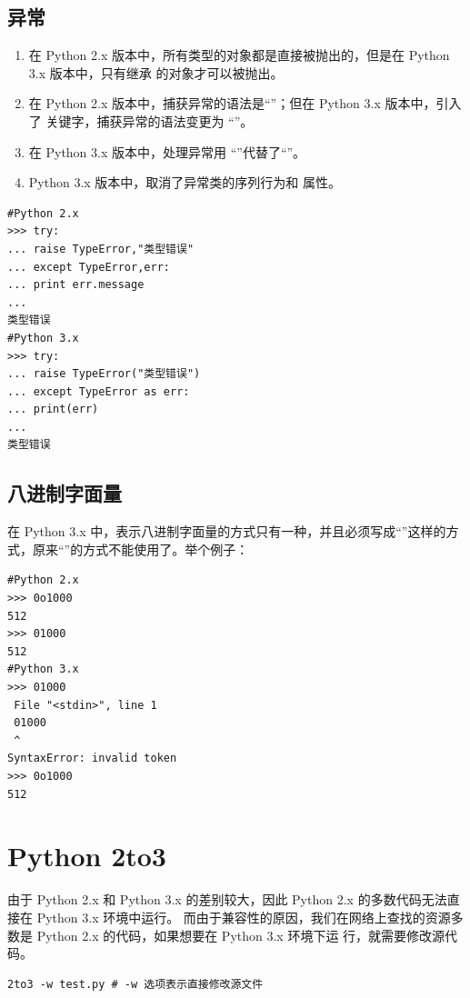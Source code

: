 \subsection{异常}
\begin{enumerate}[label=\arabic*)]
    \item 在 Python 2.x 版本中，所有类型的对象都是直接被抛出的，但是在 Python 3.x 版本中，只有继承  的对象才可以被抛出。
    \item 在 Python 2.x 版本中，捕获异常的语法是“”；但在 Python 3.x 版本中，引入了  关键字，捕获异常的语法变更为 “”。
    \item 在 Python 3.x 版本中，处理异常用 “”代替了“”。
    \item Python 3.x 版本中，取消了异常类的序列行为和  属性。
\end{enumerate}
\begin{lstlisting}[style=demostyle,numbers=none]
#Python 2.x
>>> try:
... raise TypeError,"类型错误" 
... except TypeError,err:
... print err.message
...
类型错误
#Python 3.x
>>> try:
... raise TypeError("类型错误")
... except TypeError as err:
... print(err)
...
类型错误
\end{lstlisting}   

\subsection{八进制字面量}
在 Python 3.x 中，表示八进制字面量的方式只有一种，并且必须写成“”这样的方式，原来“”的方式不能使用了。举个例子： 
\begin{lstlisting}[style=demostyle,numbers=none]
#Python 2.x
>>> 0o1000
512
>>> 01000
512
#Python 3.x
>>> 01000
 File "<stdin>", line 1
 01000
 ^ 
SyntaxError: invalid token
>>> 0o1000
512
\end{lstlisting}

\section{Python 2to3}
由于 Python 2.x 和 Python 3.x 的差别较大，因此 Python 2.x 的多数代码无法直接在 Python 3.x 环境中运行。
而由于兼容性的原因，我们在网络上查找的资源多数是 Python 2.x 的代码，如果想要在 Python 3.x 环境下运
行，就需要修改源代码。

\begin{lstlisting}[style=demostyle,numbers=none]
2to3 -w test.py # -w 选项表示直接修改源文件
\end{lstlisting}



